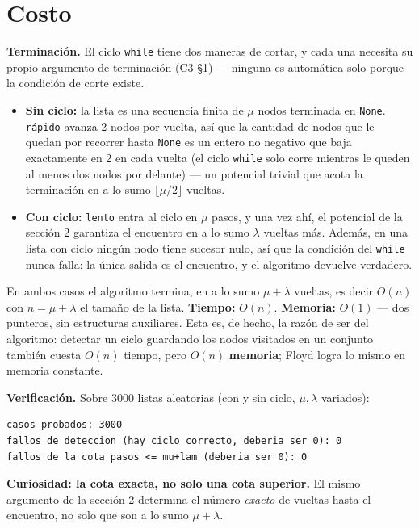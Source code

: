 \documentclass[11pt]{article}
\begin{document}
\section{Costo}

\textbf{Terminación.} El ciclo \texttt{while} tiene dos maneras de cortar, y cada una necesita su propio
argumento de terminación (C3 §1) --- ninguna es automática solo porque la condición de corte existe.
\begin{itemize}[leftmargin=14pt]
\item \textbf{Sin ciclo:} la lista es una secuencia finita de $\mu$ nodos terminada en \texttt{None}.
\texttt{rápido} avanza 2 nodos por vuelta, así que la cantidad de nodos que le quedan por recorrer hasta
\texttt{None} es un entero no negativo que baja exactamente en 2 en cada vuelta (el ciclo \texttt{while} solo
corre mientras le queden al menos dos nodos por delante) --- un potencial trivial que acota la terminación en
a lo sumo $\lfloor\mu/2\rfloor$ vueltas.
\item \textbf{Con ciclo:} \texttt{lento} entra al ciclo en $\mu$ pasos, y una vez ahí, el potencial de la
sección 2 garantiza el encuentro en a lo sumo $\lambda$ vueltas más. Además, en una lista con ciclo ningún
nodo tiene sucesor nulo, así que la condición del \texttt{while} nunca falla: la única salida es el encuentro,
y el algoritmo devuelve verdadero.
\end{itemize}
En ambos casos el algoritmo termina, en a lo sumo $\mu+\lambda$ vueltas, es decir $O(n)$ con
$n=\mu+\lambda$ el tamaño de la lista. \textbf{Tiempo:} $O(n)$. \textbf{Memoria:} $O(1)$ --- dos punteros,
sin estructuras auxiliares. Esta es, de hecho, la razón de ser del algoritmo: detectar un ciclo guardando
los nodos visitados en un conjunto también cuesta $O(n)$ tiempo, pero $O(n)$ \textbf{memoria}; Floyd logra
lo mismo en memoria constante.

\textbf{Verificación.} Sobre 3000 listas aleatorias (con y sin ciclo, $\mu,\lambda$ variados):
\begin{lstlisting}[style=salida]
casos probados: 3000
fallos de deteccion (hay_ciclo correcto, deberia ser 0): 0
fallos de la cota pasos <= mu+lam (deberia ser 0): 0
\end{lstlisting}

\textbf{Curiosidad: la cota exacta, no solo una cota superior.} El mismo argumento de la sección 2
determina el número \emph{exacto} de vueltas hasta el encuentro, no solo que son a lo sumo $\mu+\lambda$.
\end{document}
